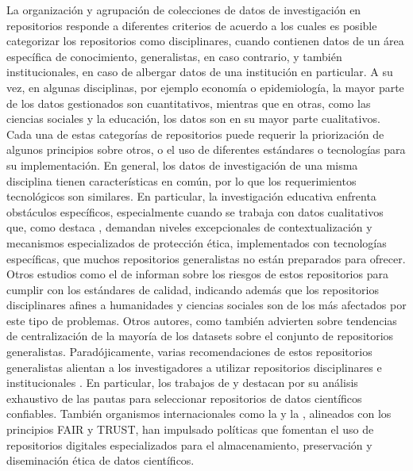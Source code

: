 \documentclass[runningheads]{llncs}
\begin{document}
La organización y agrupación de colecciones de datos de investigación en repositorios responde a diferentes criterios de acuerdo a los cuales es posible categorizar los repositorios como disciplinares, cuando contienen datos 
de un área específica de conocimiento, generalistas, en caso contrario, y también institucionales, en caso de albergar datos de una institución en particular. %
A su vez, en algunas disciplinas, por ejemplo economía o epidemiología, la mayor parte de los datos gestionados son cuantitativos, mientras que en otras, como las ciencias sociales y la educación, los datos son en su mayor parte cualitativos. Cada una de estas categorías de repositorios puede requerir la priorización de algunos principios sobre otros, o el uso de diferentes estándares o tecnologías para su implementación. En general, los datos de investigación de una misma disciplina tienen características en común, por lo que los requerimientos tecnológicos son similares. %
En particular, la investigación educativa enfrenta obstáculos específicos, especialmente cuando se trabaja con datos cualitativos que, como destaca \citet{antonio}, demandan niveles excepcionales de contextualización y mecanismos especializados de protección ética, implementados con tecnologías específicas, que muchos repositorios generalistas no están preparados para ofrecer.   
Otros estudios como el de \citet{strecker_disappearing_repos_23} informan sobre los riesgos de estos repositorios para cumplir con los estándares de calidad, indicando además que los repositorios disciplinares afines a humanidades y ciencias sociales son de los más afectados por este tipo de problemas. Otros autores, como \citet{google_dataset_aglomeration, Gerasimov2024} también advierten sobre tendencias de centralización de la mayoría de los datasets sobre el conjunto de repositorios generalistas. Paradójicamente, varias recomendaciones de estos repositorios generalistas alientan a los investigadores a utilizar repositorios disciplinares e institucionales \citep{barbosa_2024_11105430}.
En particular, los trabajos de \citet{Jia25} y \citet{avila2024} destacan por su análisis exhaustivo de las pautas para seleccionar repositorios de datos científicos confiables. 
También organismos internacionales como la \citet{unesco2021} y la \citet{OECD2020}, alineados con los principios FAIR y TRUST, han impulsado políticas que fomentan el uso de repositorios digitales especializados para el almacenamiento, preservación y diseminación ética de datos científicos.
\end{document}
